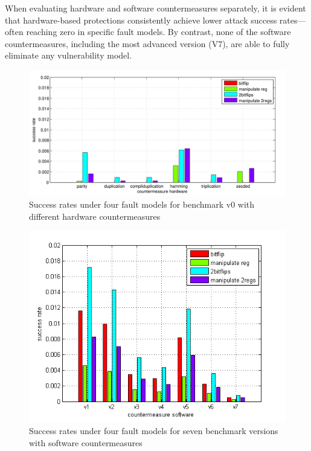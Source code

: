 When evaluating hardware and software countermeasures separately, it is evident that hardware-based protections consistently achieve lower attack success rates—often reaching zero in specific fault models. By contrast, none of the software countermeasures, including the most advanced version (V7), are able to fully eliminate any vulnerability model.

\begin{figure}[t!]
  \centering
  \includegraphics[width=0.99\linewidth]{Chapitre4/figures/hw rate.png}
  \caption{Success rates under four fault models for benchmark v0 with different hardware countermeasures}
  \label{hw cmp}
\end{figure}

\begin{figure}[t!]
  \centering
  \includegraphics[width=0.99\linewidth]{Chapitre4/figures/sw rate.png}
  \caption{Success rates under four fault models for seven benchmark versions with software countermeasures}
  \label{sw cmp}
\end{figure}

